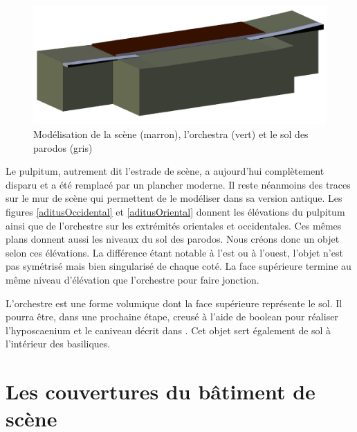 \begin{figure}[!h]
	\includegraphics[width=\linewidth]{images/modOrchestre}
	\caption[Modélisation de la scène, l'\gls{orchestra} et le sol des \gls{parodos}]{Modélisation de la scène (marron), l'\gls{orchestra} (vert) et le sol des \gls{parodos} (gris)} 
	\label{modOrchestre} 
\end{figure} 

Le \gls{pulpitum}, autrement dit l'estrade de scène, a aujourd'hui complètement disparu et a été remplacé par un plancher moderne. Il reste néanmoins des traces sur le mur de scène qui permettent de le modéliser dans sa version antique. Les figures \ref{aditusOccidental} et \ref{aditusOriental} donnent les élévations du pulpitum ainsi que de l'orchestre sur les extrémités orientales et occidentales. Ces mêmes plans donnent aussi les niveaux du sol des \gls{parodos}. Nous créons donc un objet selon ces élévations. La différence étant notable à l'est ou à l'ouest, l'objet n'est pas symétrisé mais bien singularisé de chaque coté. La face supérieure termine au même niveau d'élévation que l'orchestre pour faire jonction.

L'orchestre est une forme volumique dont la face supérieure représente le sol. Il pourra être, dans une prochaine étape, creusé à l'aide de \gls{boolean} pour réaliser l'\gls{hyposcaenium} et le caniveau décrit dans \cite[Chap. VI]{orangeTxt}. Cet objet sert également de sol à l'intérieur des \glspl{basilique}.

\section{Les couvertures du bâtiment de scène}
\label{sect-couverture}

